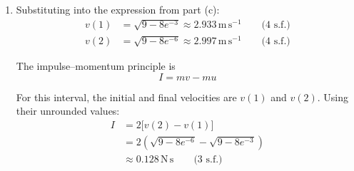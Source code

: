 \documentclass[leqno]{article}
\begin{document}
\begin{enumerate}[
  label=\textbf{\arabic*.},
  leftmargin=*,
  topsep=0pt,
  partopsep=0pt,
  parsep=0pt
]
\begin{djsSolution}
\begin{enumerate}[label=\textbf{(\alph*)}, start=1]
Using \(v=1\) when \(t=0\) gives \(k=-\ln8\). Therefore
\begin{align*}
-\ln(9-v^2)&=3t-\ln8 \\
\ln\left(\frac{9-v^2}{8}\right)&=-3t \\
9-v^2&=8e^{-3t} \\
v^2&=9-8e^{-3t}
\end{align*}

Taking the positive square root, since the particle moves in the positive direction:
\[
v=\sqrt{9-8e^{-3t}},\qquad t\geq0
\]

\item Substituting into the expression from part (c):
\begin{align*}
v(1)&=\sqrt{9-8e^{-3}}\approx2.933\,\mathrm{m\,s^{-1}}\qquad\text{(4 s.f.)} \\
v(2)&=\sqrt{9-8e^{-6}}\approx2.997\,\mathrm{m\,s^{-1}}\qquad\text{(4 s.f.)}
\end{align*}

The impulse--momentum principle is
\[
I=mv-mu
\]

For this interval, the initial and final velocities are \(v(1)\) and \(v(2)\). Using their unrounded values:
\begin{align*}
I&=2\bigl[v(2)-v(1)\bigr] \\
&=2\left(\sqrt{9-8e^{-6}}-\sqrt{9-8e^{-3}}\right) \\
&\approx0.128\,\mathrm{N\,s}\qquad\text{(3 s.f.)}
\end{align*}

\end{enumerate}
\end{djsSolution}

\end{enumerate}
\end{document}
